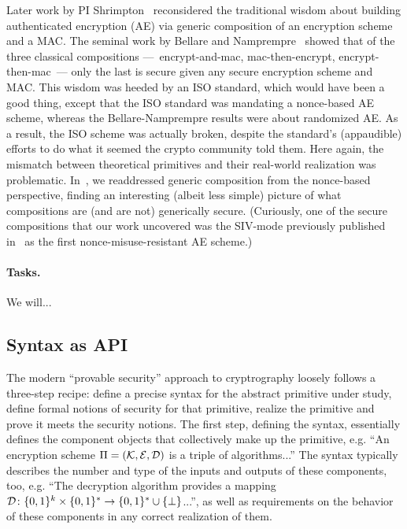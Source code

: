 {Later work by PI Shrimpton~\cite{NRS} reconsidered the traditional wisdom about building authenticated encryption (AE) via generic composition of an encryption scheme and a MAC.   The seminal work by Bellare and Namprempre~\cite{BN} showed that of the three classical compositions ---~encrypt-and-mac, mac-then-encrypt, encrypt-then-mac~--- only the last is secure given any secure encryption scheme and MAC.   This wisdom was heeded by an ISO standard, which would have been a good thing, except that the ISO standard was mandating a nonce-based AE scheme, whereas the Bellare-Namprempre results were about randomized AE.  As a result, the ISO scheme was actually broken, despite the standard's (appaudible) efforts to do what it seemed the crypto community told them.  Here again, the mismatch between theoretical primitives and their real-world realization was problematic.  In~\cite{NRS}, we readdressed generic composition from the nonce-based perspective, finding an interesting (albeit less simple) picture of what compositions are (and are not) generically secure.  (Curiously, one of the secure compositions that our work uncovered was the SIV-mode previously published in~\cite{RS06} as the first nonce-misuse-resistant AE scheme.)

\paragraph{Tasks.}
We will...


\subsection{Syntax as API}
The modern ``provable security'' approach to cryptrography loosely follows a three-step recipe: define a precise syntax for the abstract primitive under study, define formal notions of security for that primitive, realize the primitive and prove it meets the security notions.  The first step, defining the syntax, essentially defines the component objects that collectively make up the primitive, e.g. ``An encryption scheme $\Pi=(\mathcal{K},\mathcal{E},\mathcal{D})$ is a triple of algorithms...''  The syntax typically describes the number and type of the inputs and outputs of these components, too, e.g. ``The decryption algorithm provides a mapping $\mathcal{D}\colon\{0,1\}^{k}\times\{0,1\}^* \to \{0,1\}^* \cup \{\bot\}$...'', as well as requirements on the behavior of these components in any correct realization of them.   
%

}
